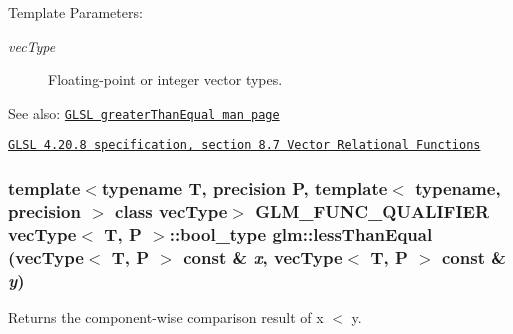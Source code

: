 \begin{Desc}
\item[Template Parameters:]
\begin{description}
\item[{\em vecType}]Floating-point or integer vector types.\end{description}
\end{Desc}
\begin{Desc}
\item[See also:]\href{http://www.opengl.org/sdk/docs/manglsl/xhtml/greaterThanEqual.xml}{\tt GLSL greaterThanEqual man page} 

\href{http://www.opengl.org/registry/doc/GLSLangSpec.4.20.8.pdf}{\tt GLSL 4.20.8 specification, section 8.7 Vector Relational Functions} \end{Desc}
\hypertarget{group__core__func__vector__relational_g9792ee46fa6f48a7f750984128c24d03}{
\subsubsection[lessThanEqual]{\setlength{\rightskip}{0pt plus 5cm}template$<$typename T, precision P, template$<$ typename, precision $>$ class vecType$>$ GLM\_\-FUNC\_\-QUALIFIER vecType$<$ T, P $>$::bool\_\-type glm::lessThanEqual (vecType$<$ T, P $>$ const \& {\em x}, \/  vecType$<$ T, P $>$ const \& {\em y})}}
\label{group__core__func__vector__relational_g9792ee46fa6f48a7f750984128c24d03}


Returns the component-wise comparison result of x $<$ y.

